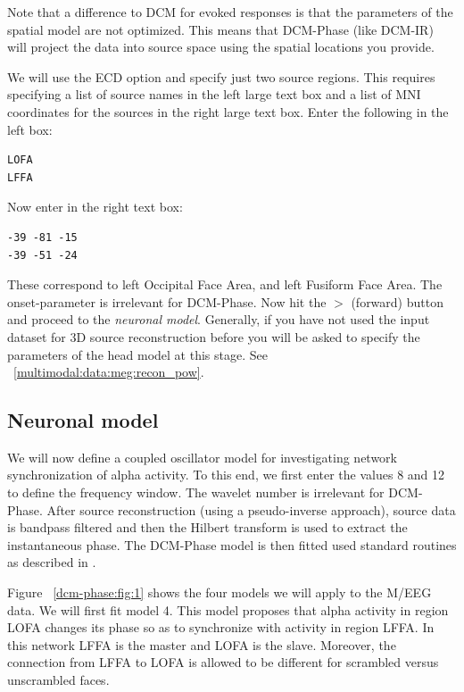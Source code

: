 Note that a difference to DCM for evoked responses is that the parameters of the spatial model are not optimized. This means that DCM-Phase (like DCM-IR) will project the data into source space using the spatial locations you provide.

We will use the ECD option and specify just two source regions. This requires specifying a list of source names in the left large text box and a list of MNI coordinates for the sources in the right large text box. Enter the following in the left box:

\begin{verbatim}
LOFA
LFFA
\end{verbatim}

Now enter in the right text box:

\begin{verbatim}
-39 -81 -15
-39 -51 -24
\end{verbatim}

These correspond to left Occipital Face Area, and left Fusiform Face Area.
The onset-parameter is irrelevant for DCM-Phase. Now hit the $>$ (forward) button and proceed to the \textit{neuronal model}. Generally, if you have not used the input dataset for 3D source reconstruction before you will be asked to specify the parameters of the head model at this stage. See ~\ref{multimodal:data:meg:recon_pow}. 

\subsection{Neuronal model}

We will now define a coupled oscillator model for investigating network synchronization of alpha activity. To this end, we first enter the values 8 and 12 to define the frequency window. The wavelet number is irrelevant for DCM-Phase. After source reconstruction (using a pseudo-inverse approach), source data is bandpass filtered and then the Hilbert transform is used to extract the instantaneous phase. The DCM-Phase model is then fitted used standard routines as described in \cite{dcm_phase}.

Figure ~\ref{dcm-phase:fig:1} shows the four models we will apply to the 
M/EEG data. We will first fit model 4. This model proposes that alpha activity in region LOFA changes its phase so as to synchronize with activity in region LFFA. In this network LFFA is the master and LOFA is the slave. Moreover, the 
connection from LFFA to LOFA is allowed to be different for scrambled versus unscrambled faces.

